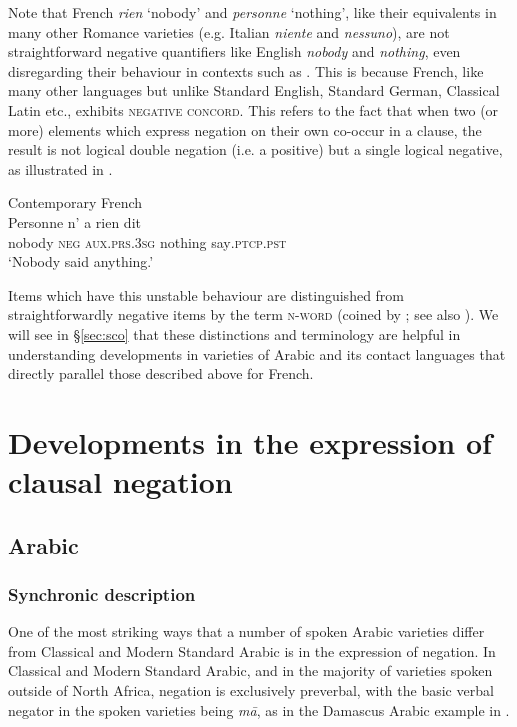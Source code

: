 \documentclass[output=paper]{langsci/langscibook}
\begin{document}
Note that French \textit{rien} ‘nobody’ and \textit{personne} ‘nothing’, like their equivalents in many other Romance varieties (e.g. Italian \textit{niente} and \textit{nessuno}), are not straightforward negative quantifiers like English \textit{nobody} and \textit{nothing}, even disregarding their behaviour in contexts such as . This is because French, like many other languages but unlike Standard English, Standard German, Classical Latin etc., exhibits \textsc{negative} \textsc{concord}. This refers to the fact that when two (or more) elements which express negation on their own co-occur in a clause, the result is not logical double negation (i.e. a positive) but a single logical negative, as illustrated in .

\ea\label{cont2}
{       Contemporary French \citep[69]{Hansen2013}} \\
\gll Personne n’ a rien dit\\
     nobody \textsc{neg} \textsc{aux}.\textsc{prs.3sg} nothing say\textsc{.ptcp.pst}\\
\glt ‘Nobody said anything.’
\z

Items which have this unstable behaviour are distinguished from straightforwardly negative items by the term \textsc{n-word} (coined by \citealt{Laka1990}; see also \citealt{Giannakidou2006}). We will see in §\ref{sec:sco} that these distinctions and terminology are helpful in understanding developments in varieties of Arabic and its contact languages that directly parallel those described above for French.


\section{Developments in the expression of clausal negation}\label{sec:dev}


\subsection{Arabic}





\subsubsection{Synchronic description}



One of the most striking ways that a number of spoken Arabic varieties differ from Classical and Modern Standard Arabic is in the expression of negation. In Classical and Modern Standard Arabic, and in the majority of varieties spoken outside of North Africa, negation is exclusively preverbal, with the basic verbal negator in the spoken varieties being \textit{mā}, as in the Damascus Arabic example in .
\end{document}
